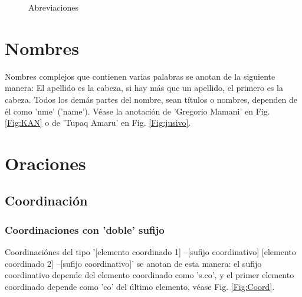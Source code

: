 \documentclass[a4paper,11pt,DIV12]{scrartcl}
\begin{document}
\begin{figure}
\begin{center}
 \caption{Abreviaciones}\label{Fig:abbrev}
\end{center}
\end{figure}

\section{Nombres}

Nombres complejos que contienen varias palabras se anotan de la siguiente manera: El apellido es la cabeza, si hay m\'as que un apellido, el primero es la cabeza. Todos los dem\'as partes del nombre, sean t\'itulos o nombres, dependen de \'el como 'nme' ('name'). V\'ease la anotaci\'on de 'Gregorio Mamani' en Fig. \ref{Fig:KAN} o de 'Tupaq Amaru' en Fig. \ref{Fig:jusivo}.


\section{Oraciones}\label{Sec:oraciones}
\subsection{Coordinaci\'on}\label{Sec:coord}

\subsubsection{Coordinaciones con 'doble' sufijo}\label{Sec:coorddoble}
Coordinaci\'ones del tipo '[elemento coordinado 1] --[sufijo coordinativo] [elemento coordinado 2] --[sufijo coordinativo]'  se anotan de esta manera: el sufijo coordinativo depende del elemento coordinado como 's.co', y el primer elemento coordinado depende como 'co' del \'ultimo elemento, v\'ease Fig. \ref{Fig:Coord}. 
\end{document}
